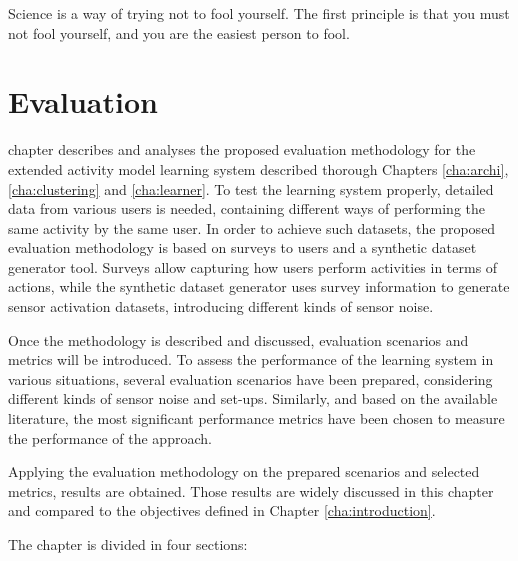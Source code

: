 

\begin{savequote}[50mm]
Science is a way of trying not to fool yourself. The first principle is that you must not fool yourself, and you are the easiest person to fool.
\end{savequote}


\chapter{Evaluation}
\label{cha:evaluation}

\ifpdf
    \graphicspath{{6_evaluation/figures/PDF/}{6_evaluation/figures/PNG/}{6_evaluation/figures/}}
\else
    \graphicspath{{6_evaluation/figures/EPS/}{6_evaluation/figures/}}
\fi

 chapter describes and analyses the proposed evaluation methodology for the extended activity model learning system described thorough Chapters \ref{cha:archi}, \ref{cha:clustering} and \ref{cha:learner}. To test the learning system properly, detailed data from various users is needed, containing different ways of performing the same activity by the same user. In order to achieve such datasets, the proposed evaluation methodology is based on surveys to users and a synthetic dataset generator tool. Surveys allow capturing how users perform activities in terms of actions, while the synthetic dataset generator uses survey information to generate sensor activation datasets, introducing different kinds of sensor noise. 

Once the methodology is described and discussed, evaluation scenarios and metrics will be introduced. To assess the performance of the learning system in various situations, several evaluation scenarios have been prepared, considering different kinds of sensor noise and set-ups. Similarly, and based on the available literature, the most significant performance metrics have been chosen to measure the performance of the approach.

Applying the evaluation methodology on the prepared scenarios and selected metrics, results are obtained. Those results are widely discussed in this chapter and compared to the objectives defined in Chapter \ref{cha:introduction}.

The chapter is divided in four sections:

